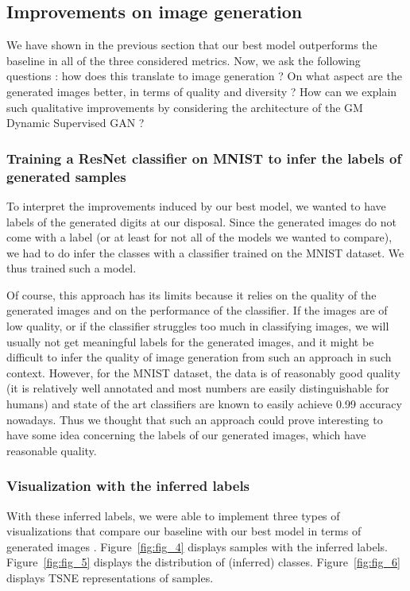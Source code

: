 \documentclass[10pt]{article}
\begin{document}
\subsection{Improvements on image generation}

We have shown in the previous section that our best model outperforms the baseline in all of the three considered metrics. Now, we ask the following questions : how does this translate to image generation ? On what aspect are the generated images better, in terms of quality and diversity ? How can we explain such qualitative improvements by considering the architecture of the GM Dynamic Supervised GAN ?
\subsubsection{Training a ResNet classifier on MNIST to infer the labels of generated samples}

To interpret the improvements induced by our best model, we wanted to have labels of the generated digits at our disposal. Since the generated images do not come with a label (or at least for not all of the models we wanted to compare), we had to do infer the classes with a classifier trained on the MNIST dataset. We thus trained such a model.

Of course, this approach has its limits because it relies on the quality of the generated images and on the performance of the classifier. If the images are of low quality, or if the classifier struggles too much in classifying images, we will usually not get meaningful labels for the generated images, and it might be difficult to infer the quality of image generation from such an approach in such context. However, for the MNIST dataset, the data is of reasonably good quality (it is relatively well annotated and most numbers are easily distinguishable for humans) and state of the art classifiers are known to easily achieve 0.99 accuracy nowadays. Thus we thought that such an approach could prove interesting to have some idea concerning the labels of our generated images, which have reasonable quality.

\subsubsection{Visualization with the inferred labels}

With these inferred labels, we were able to implement three types of visualizations that compare our baseline with our best model in terms of generated images . Figure~\ref{fig:fig_4} displays samples with the inferred labels. Figure~\ref{fig:fig_5} displays the distribution of (inferred) classes. Figure~\ref{fig:fig_6} displays TSNE representations of samples.
\end{document}
